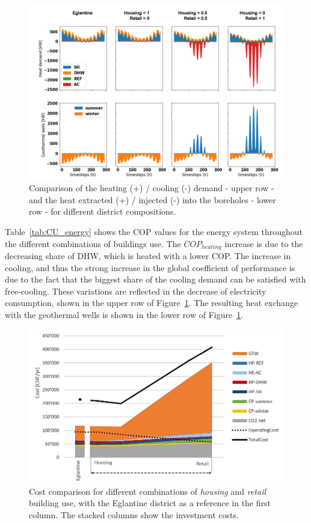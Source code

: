 \documentclass{article}
\begin{document}


\begin{figure}[tph]
	\centering
	\includegraphics[width=1\linewidth]{Images/CU}
	\caption{Comparison of the heating (+) / cooling (-) demand - upper row - and the heat extracted (+) / injected (-) into the boreholes - lower row - for different district compositions.}
	\label{fig:cu}
\end{figure}

Table~\ref{tab:CU_energy} shows the COP values for the energy system throughout the different combinations of buildings use. The $COP_{heating}$ increase is due to the decreasing share of DHW, which is heated with a lower COP. The increase in cooling, and thus the strong increase in the global coefficient of performance is due to the fact that the biggest share of the cooling demand can be satisfied with free-cooling. These variations are reflected in the decrease of electricity consumption, shown in the upper row of Figure~\ref{fig:cu}. The resulting heat exchange with the geothermal wells is shown in the lower row of Figure~\ref{fig:cu}.

\begin{figure}[htp]
	\centering
	\includegraphics[width=1\textwidth]{CU_SA_TC.png}
	\caption{Cost comparison for different combinations of \textit{housing} and \textit{retail} building use, with the Eglantine district as a reference in the first column. The stacked columns show the investment costs.}
	\label{fig:CU_TC}
\end{figure}
\end{document}
